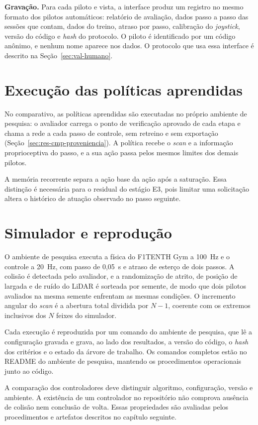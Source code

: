 \textbf{Gravação.} Para cada piloto e vista, a interface produz um registro no
mesmo formato dos pilotos automáticos: relatório de avaliação, dados passo a
passo das sessões que contam, dados do treino, atraso por passo, calibração do
\textit{joystick}, versão do código e \textit{hash} do protocolo. O piloto é
identificado por um código anônimo, e nenhum nome aparece nos dados. O protocolo
que usa essa interface é descrito na Seção~\ref{sec:val-humano}.

\section{Execução das políticas aprendidas}

No comparativo, as políticas aprendidas são executadas no próprio ambiente de
pesquisa: o avaliador carrega o ponto de verificação aprovado de cada etapa e
chama a rede a cada passo de controle, sem retreino e sem exportação
(Seção~\ref{sec:res-cmp-proveniencia}). A política recebe o \textit{scan} e a
informação proprioceptiva do passo, e a sua ação passa pelos mesmos limites dos
demais pilotos.

A memória recorrente separa a ação base da ação após a saturação. Essa
distinção é necessária para o residual do estágio E3, pois limitar uma
solicitação altera o histórico de atuação observado no passo seguinte.

\section{Simulador e reprodução}

O ambiente de pesquisa executa a física do F1TENTH Gym a 100~Hz e o controle a
20~Hz, com passo de 0,05~s e atraso de esterço de dois passos. A colisão é
detectada pelo avaliador, e a randomização de atrito, de posição de largada e de
ruído do LiDAR é sorteada por semente, de modo que dois pilotos avaliados na
mesma semente enfrentam as mesmas condições. O incremento angular do
\textit{scan} é a abertura total dividida por $N-1$, coerente com os extremos
inclusivos dos $N$ feixes do simulador.

Cada execução é reproduzida por um comando do ambiente de pesquisa, que lê a
configuração gravada e grava, ao lado dos resultados, a versão do código, o
\textit{hash} dos critérios e o estado da árvore de trabalho. Os comandos
completos estão no README do ambiente de pesquisa, mantendo os procedimentos
operacionais junto ao código.

A comparação dos controladores deve distinguir algoritmo, configuração,
versão e ambiente. A existência de um controlador no repositório não comprova
ausência de colisão nem conclusão de volta. Essas propriedades
são avaliadas pelos procedimentos e artefatos descritos no capítulo seguinte.
